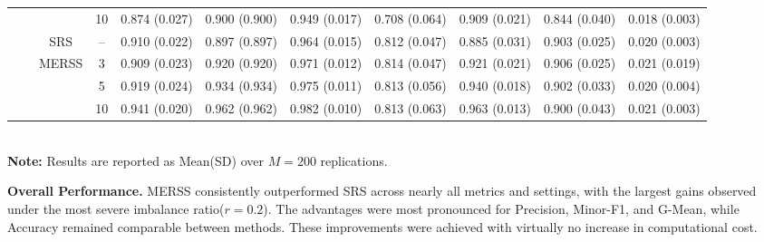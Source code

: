 \documentclass[twoside]{article}
\begin{document}
\begin{table}[!htb]
{\begin{tabular}{c c c c c c c c c c c}
    &                      &                                          &  10   &
   0.874 (0.027) & 0.900 (0.900) & 0.949 (0.017) & 0.708 (0.064) & 0.909 (0.021) & 0.844 (0.040)& 0.018 (0.003)  \\


  

    \cmidrule(lr){2-11}
 &\multirow{9}{*}{ }  & 
    \multirow{1}{*}{SRS} & -- 
 &0.910 (0.022) & 0.897 (0.897) & 0.964 (0.015) & 0.812 (0.047) & 0.885 (0.031) & 0.903 (0.025)& 0.020 (0.003)  \\


    
    \cmidrule(lr){3-11}
    &                      & \multirow{3}{*}{MERSS}   &  3   & 
    0.909 (0.023) & 0.920 (0.920) & 0.971 (0.012) & 0.814 (0.047) & 0.921 (0.021) & 0.906 (0.025)& 0.021 (0.019)  \\

    &               0.7       &                                          &  5    &
    0.919 (0.024) & 0.934 (0.934) & 0.975 (0.011) & 0.813 (0.056) & 0.940 (0.018) & 0.902 (0.033)& 0.020 (0.004)  \\


    &                      &                                          &  10   &
   0.941 (0.020) & 0.962 (0.962) & 0.982 (0.010) & 0.813 (0.063) & 0.963 (0.013) & 0.900 (0.043)& 0.021 (0.003)  \\

    \bottomrule 
    
\end{tabular}
}
 \\[4pt]
    \scriptsize \textbf{Note:} Results are reported as Mean(SD) over \(M = 200\) replications.

\end{table}

\textbf{Overall Performance.}
MERSS consistently outperformed SRS across nearly all metrics and settings, with the largest gains observed under the most severe imbalance ratio(\(r = 0.2\)). The advantages were most pronounced for Precision, Minor-F1, and G-Mean, while Accuracy remained comparable between methods. These improvements were achieved with virtually no increase in computational cost.
\end{document}
